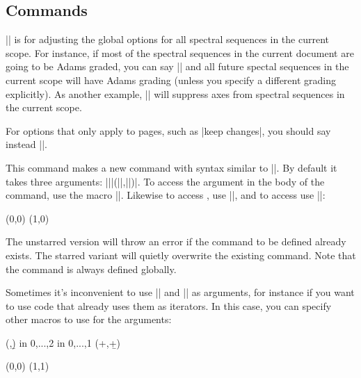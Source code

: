 \documentclass{ltxdoc}
\begin{document}
\begin{sseqdata}[name=ex1,degree={#1}{1-#1}]
\section{Commands}
\begin{command}{\sseqset{}}
|\sseqset| is for adjusting the global options for all spectral sequences in the current scope. For instance, if most of the spectral sequences in the current document are going to be Adams graded, you can say || and all future spectal sequences in the current scope will have Adams grading (unless you specify a different grading explicitly). As another example, || will suppress axes from spectral sequences in the current scope.

For options that only apply to pages, such as |keep changes|, you should say instead ||.
\end{command}

\begin{command}{\sseqnewcmd\opt{*}}
This command makes a new command with syntax similar to |\class|. By default it takes three arguments: |\mycommand||(||,||)|. To access the  argument in the body of the command, use the macro |\options|. Likewise to access , use |\x|, and to access  use |\y|:
\begin{codeexample}[]
\sseqnewcmd{}
\begin{sseqpage}
\featuregroup[orange](0,0)
\featuregroup[red](1,0)
\end{sseqpage}
\end{codeexample}
The unstarred version will throw an error if the command to be defined already exists. The starred variant will quietly overwrite the existing command. Note that the command is always defined globally.

Sometimes it's inconvenient to use |\x| and |\y| as arguments, for instance if you want to use code that already uses them as iterators. In this case,
you can specify other macros to use for the arguments:
\begin{codeexample}[width=6cm]
\sseqnewcmd\test(\a,\b){
    \foreach \x in {0,...,2} \foreach \y in {0,...,1}{
        \class[\options](\a+\x,\b+\y)
    }
}
\begin{sseqpage}
\test(0,0)
(1,1)
\end{sseqpage}
\end{codeexample}


\end{command}
\end{sseqdata}
\end{document}
